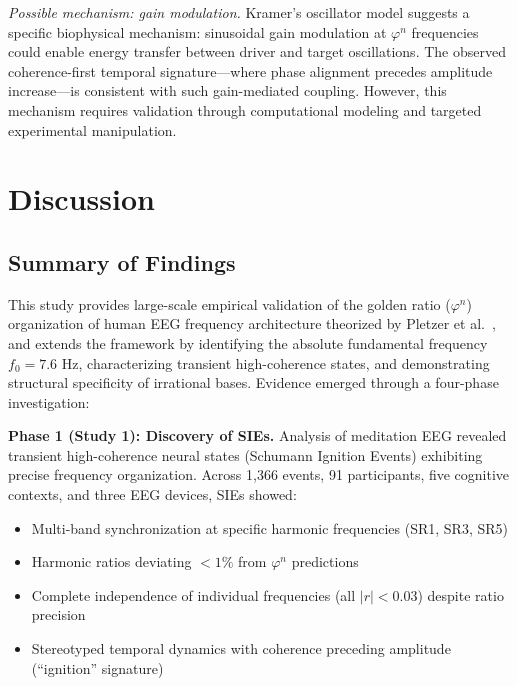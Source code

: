 \documentclass[11pt,a4paper]{article}
\newcommand{\phisym}{\varphi}
\begin{document}
\textit{Possible mechanism: gain modulation.} Kramer's \parencite{kramer2022golden} oscillator model suggests a specific biophysical mechanism: sinusoidal gain modulation at $\phisym^n$ frequencies could enable energy transfer between driver and target oscillations. The observed coherence-first temporal signature---where phase alignment precedes amplitude increase---is consistent with such gain-mediated coupling. However, this mechanism requires validation through computational modeling and targeted experimental manipulation.

\section{Discussion}

\subsection{Summary of Findings}

This study provides large-scale empirical validation of the golden ratio ($\phisym^n$) organization of human EEG frequency architecture theorized by Pletzer et al.\ \parencite{pletzer2010golden}, and extends the framework by identifying the absolute fundamental frequency $f_0 = 7.6$ Hz, characterizing transient high-coherence states, and demonstrating structural specificity of irrational bases. Evidence emerged through a four-phase investigation:

\textbf{Phase 1 (Study 1): Discovery of SIEs.} Analysis of meditation EEG revealed transient high-coherence neural states (Schumann Ignition Events) exhibiting precise frequency organization. Across 1,366 events, 91 participants, five cognitive contexts, and three EEG devices, SIEs showed:
\begin{itemize}
    \item Multi-band synchronization at specific harmonic frequencies (SR1, SR3, SR5)
    \item Harmonic ratios deviating $<1\%$ from $\phisym^n$ predictions
    \item Complete independence of individual frequencies (all $|r| < 0.03$) despite ratio precision
    \item Stereotyped temporal dynamics with coherence preceding amplitude (``ignition'' signature)
\end{itemize}
\end{document}
